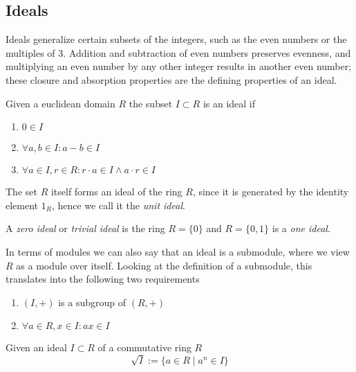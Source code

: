 \subsection{Ideals}
Ideals generalize certain subsets of the integers, such as the even numbers or the multiples of 3.
Addition and subtraction of even numbers preserves evenness, and multiplying an even number by any other integer results in another even number; these closure and absorption properties are the defining properties of an ideal.

\begin{definition}[Ideal]
   Given a euclidean domain \(R\) the subset \(I \subset R\) is an ideal if
   \begin{enumerate}[label=\roman*, align=Center]
      \item \(0 \in I\)
      \item \(\forall a, b \in I: a - b \in I\)
      \item \(\forall a \in I, r \in R: r \cdot a \in I \land a \cdot r \in I\)
   \end{enumerate}
\end{definition}
\begin{remark}
   The set \(R\) itself forms an ideal of the ring \(R\), since it is generated by the identity element \(1_R\), hence we call it the \emph{unit ideal}.
\end{remark}
\begin{remark}
   A \emph{zero ideal} or \emph{trivial ideal} is the ring \(R = \{0\}\) and \(R = \{0, 1\}\) is a \emph{one ideal}.
\end{remark}
\begin{remark}
   In terms of modules we can also say that an ideal is a submodule, where we view \(R\) as a module over itself.
   Looking at the definition of a submodule, this translates into the following two requirements
   \begin{enumerate}[label=\roman*, align=Center]
      \item \((I, +)\) is a subgroup of \((R, +)\)
      \item \(\forall a \in R, x \in I: ax \in I\)
   \end{enumerate}
\end{remark}

\begin{definition}
   Given an ideal \(I \subset R\) of a commutative ring \(R\)
   \[\sqrt{I} := \{a \in R \mid a^n \in I\}\]
\end{definition}

